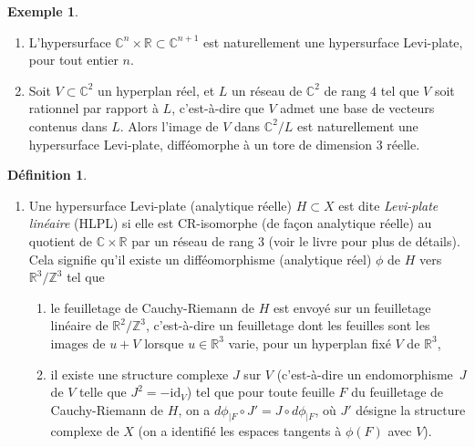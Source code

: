 \documentclass[JEP,XML,SOM,Unicode,francais,published]{cedram}
\newcommand{\Z}{\mathbb{Z}}
\newcommand{\R}{\mathbb{R}}
\newcommand{\C}{\mathbb{C}}
\theoremstyle{definition}
\newtheorem{exemple}[thm]{Exemple}
\newtheorem{defn}[thm]{Définition}
\begin{document}
\skpt
\begin{exemple}
\begin{enumerate}
\item L'hypersurface $\C^n\times\R \subset \C^{n + 1}$ est naturellement une hypersurface Levi-plate, pour tout entier $n$.
\item Soit $V \subset \C^2$ un hyperplan réel, et $L$ un réseau de $\C^2$ de rang $4$ tel que $V$ soit rationnel par rapport à $L$, c'est-à-dire que $V$ admet une base de vecteurs contenus dans $L$. Alors l'image de $V$ dans $\C^2/L$ est naturellement une hypersurface Levi-plate, difféomorphe à un tore de dimension $3$ réelle.
\end{enumerate}
\end{exemple}

\skpt
\begin{defn} \begin{enumerate}
\item Une hypersurface Levi-plate (analytique réelle) $H \subset X$ est dite \emph{Levi-plate linéaire} (HLPL) si elle est CR-isomorphe (de façon analytique réelle) au quotient de $\C\times\R$ par un réseau de rang $3$ (voir le livre \cite{CRStructures} pour plus de détails). Cela signifie qu'il existe un difféomorphisme (analytique réel) $\phi$ de $H$ vers $\R^3/\Z^3$ tel que
\begin{enumerate}
\item le feuilletage de Cauchy-Riemann de $H$ est envoyé sur un feuilletage liné\-aire de $\R^2/\Z^3$, c'est-à-dire un feuilletage dont les feuilles sont les images de $u + V$ lorsque $u \in\R^3$ varie, pour un hyperplan fixé $V$ de $\R^3$,
\item il existe une structure complexe $J$ sur $V$ (c'est-à-dire un endomorphisme~$J$ de $V$ telle que $J^2 = -\mathrm{id}_V$) tel que pour toute feuille $F$ du feuilletage de Cauchy-Riemann de $H$, on a $d\phi_{|F} \circ J' = J \circ d\phi_{|F}$, où $J'$ désigne la structure complexe de $X$ (on a identifié les espaces tangents à $\phi(F)$ avec $V$).
\end{enumerate}


\end{enumerate}
\end{defn}
\end{document}

